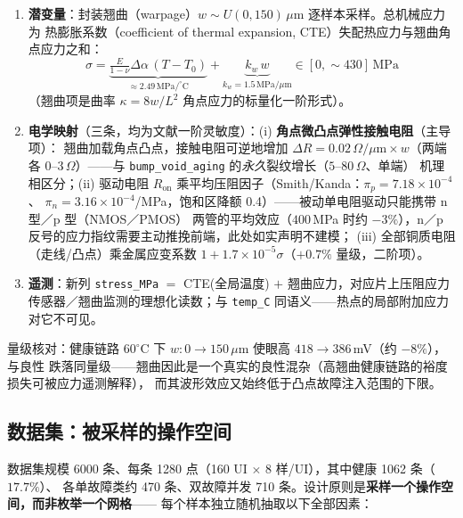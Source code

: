 \documentclass[11pt,a4paper,fontset=mac]{ctexart}
\begin{document}
\begin{enumerate}
\item \textbf{潜变量}：封装翘曲（warpage）$w\sim U(0,150)\,\mu$m 逐样本采样。总机械应力为
热膨胀系数（coefficient of thermal expansion, CTE）失配热应力与翘曲角点应力之和：
\[\sigma=\underbrace{\tfrac{E}{1-\nu}\Delta\alpha\,(T-T_0)}_{\approx 2.49\,\text{MPa}/^\circ\text{C}}
+\underbrace{k_w\,w}_{k_w=1.5\,\text{MPa}/\mu\text{m}}\in[0,\sim430]\,\text{MPa}\]
（翘曲项是曲率 $\kappa=8w/L^2$ 角点应力的标量化一阶形式）。
\item \textbf{电学映射}（三条，均为文献一阶灵敏度）：(i) \textbf{角点微凸点弹性接触电阻}（主导项）：
翘曲加载角点凸点，接触电阻可逆地增加 $\Delta R = 0.02\,\Omega/\mu\text{m}\times w$（两端各
$0$--$3\,\Omega$）——与 \texttt{bump\_void\_aging} 的\emph{永久}裂纹增长（$5$--$80\,\Omega$、单端）
机理相区分；(ii) 驱动电阻 $R_\text{on}$ 乘平均压阻因子（Smith/Kanda：$\pi_p=7.18\times10^{-4}$、
$\pi_n=3.16\times10^{-4}$/MPa，饱和区降额 0.4）——被动单电阻驱动只能携带 n 型／p 型（NMOS／PMOS）
两管的平均效应（$400$\,MPa 时约 $-3\%$），n／p 反号的应力指纹需要主动推挽前端，此处如实声明不建模；
(iii) 全部铜质电阻（走线/凸点）乘金属应变系数 $1+1.7\times10^{-5}\sigma$（$+0.7\%$ 量级，二阶项）。
\item \textbf{遥测}：新列 \texttt{stress\_MPa} $=$ CTE(全局温度) $+$ 翘曲应力，对应片上压阻应力
传感器／翘曲监测的理想化读数；与 \texttt{temp\_C} 同语义——热点的局部附加应力对它不可见。
\end{enumerate}

量级核对：健康链路 $60^\circ$C 下 $w:0\to150\,\mu$m 使眼高 $418\to386$\,mV（约 $-8\%$），与良性
跌落同量级——翘曲因此是一个真实的良性混杂（高翘曲健康链路的裕度损失可被应力遥测解释），
而其波形效应又始终低于凸点故障注入范围的下限。

\subsection{数据集：被采样的操作空间}\label{sec:dataset}
数据集规模 6000 条、每条 1280 点（160 UI $\times$ 8 样/UI），其中健康 1062 条（$17.7\%$）、
各单故障类约 470 条、双故障并发 710 条。设计原则是\textbf{采样一个操作空间，而非枚举一个网格}——
每个样本独立随机抽取以下全部因素：
\end{document}
